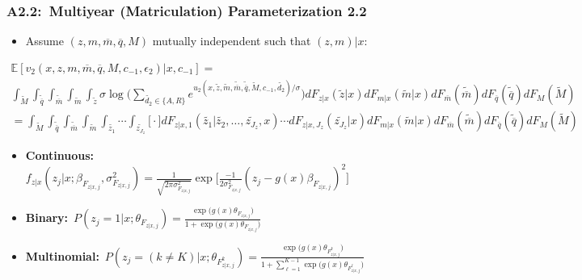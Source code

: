 \documentclass[12pt, aspectratio=169]{beamer}
\begin{document}
\begin{frame}[label=mmp22]
\frametitle{A2.2:\ Multiyear (Matriculation) Parameterization 2.2}
\begin{itemize}
\item[$\bigstar$] Assume $(z,m,\overline{m},\overline{q},M)$ mutually independent such that $(z,m)|x$:
\end{itemize}
\scriptsize
\begin{multline*}
\mathbb{E}[v_2(x,z,m,\overline{m},\overline{q},M,c_{-1},\epsilon_2)|x,c_{-1}] = \\
\int_{\widetilde M}\int_{\widetilde{\overline{q}}}\int_{\widetilde{\overline{m}}}\int_{\widetilde m}\int_{\widetilde z}\sigma\log\bigg(\sum_{\widetilde{d_2}\in\{A,R\}}e^{u_2(x,\widetilde z,\widetilde m,\widetilde{\overline{m}},\widetilde{\overline{q}},\widetilde M,c_{-1},\widetilde{d_2})/\sigma}\bigg)dF_{z|x}(\widetilde z|x)dF_{m|x}(\widetilde m|x)dF_{\overline m}(\widetilde{\overline{m}})dF_{\overline q}(\widetilde{\overline{q}})dF_M(\widetilde M) \\
= \int_{\widetilde M}\int_{\widetilde{\overline{q}}}\int_{\widetilde{\overline{m}}}\int_{\widetilde m}\int_{\widetilde{z_1}}\cdots\int_{\widetilde{z_{J_z}}}\bigg[\cdot\bigg]dF_{z|x,1}(\widetilde{z_1}|\widetilde{z_2},\dots,\widetilde{z_{J_z}},x)\cdots dF_{z|x,{J_z}}(\widetilde{z_{J_z}}|x)dF_{m|x}(\widetilde m|x)dF_{\overline m}(\widetilde{\overline{m}})dF_{\overline q}(\widetilde{\overline{q}})dF_M(\widetilde M)
\end{multline*}
\normalsize
\begin{itemize}
\item \textbf{Continuous:}\ \footnotesize $f_{z|x}(z_j|x;\beta_{F_{z|x,j}},\sigma^2_{F_{z|x,j}}) = \frac{1}{\sqrt{2\pi\sigma^2_{F_{z|x,j}}}}\exp\Big[\frac{-1}{2\sigma^2_{F_{z|x,j}}}(z_j-g(x)\beta_{F_{z|x,j}})^2\Big]$ \normalsize
\item \textbf{Binary:}\ \footnotesize $P(z_j=1|x;\theta_{F_{z|x,j}}) = \frac{\exp\big(g(x)\theta_{F_{z|x,j}}\big)}{1+\exp\big(g(x)\theta_{F_{z|x,j}}\big)}$ \normalsize
\item \textbf{Multinomial:}\ \footnotesize $P(z_j=(k\neq K)|x;\theta_{F_{z|x,j}^k}) = \frac{\exp\Big(g(x)\theta_{F_{z|x,j}^k}\Big)}{1+\sum_{\ell=1}^{K-1}\exp\Big(g(x)\theta_{F_{z|x,j}^\ell}\Big)}$
\end{itemize}
\hyperlink{conc}{}
\end{frame}
\end{document}
